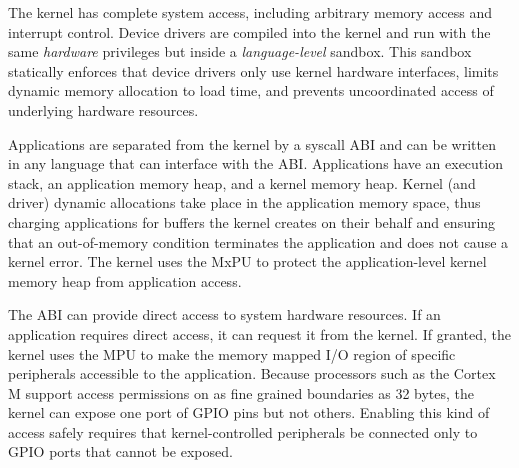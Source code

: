 
The \name kernel has complete system access, including arbitrary memory
access and interrupt control. Device drivers are compiled into the kernel and
run with the same \emph{hardware} privileges but inside a
\emph{language-level} sandbox. This sandbox statically enforces that device
drivers only use kernel hardware interfaces, limits dynamic memory
allocation to load time, and prevents uncoordinated access of underlying
hardware resources.

Applications are separated from the kernel by a syscall ABI and can be
written in any language that can interface with the ABI. 
Applications have an execution stack, an application memory
heap, and a kernel memory heap. Kernel (and driver) dynamic allocations take
place in the application memory space, thus charging applications for buffers
the kernel creates on their behalf and ensuring that an out-of-memory
condition terminates the application and does not cause a kernel error. 
The kernel uses the MxPU to protect the application-level kernel memory heap
from application access.

The ABI can provide direct access to system hardware resources. If an 
application requires direct access, it can request it from the kernel.
If granted, the kernel uses the MPU to make the memory mapped I/O region
of specific peripherals accessible to the application. Because processors
such as the Cortex M support access permissions on as fine grained boundaries
as 32 bytes, the kernel can expose one port of GPIO pins but not others.
Enabling this kind of access safely requires that kernel-controlled
peripherals be connected only to GPIO ports that cannot be exposed.



